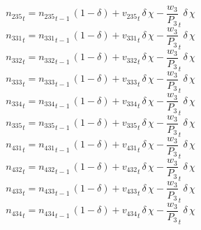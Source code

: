 \begin{dmath}
{{n_{235}}}_{t}={{n_{235}}}_{t-1}\, \left(1-{{\delta}}\right)+{{v_{235}}}_{t}\, {{\delta}}\, {{\chi}}-{{\frac{w_{3}}{P_{3}}}}_{t}\, {{\delta}}\, {{\chi}}
\end{dmath}
\begin{dmath}
{{n_{331}}}_{t}={{n_{331}}}_{t-1}\, \left(1-{{\delta}}\right)+{{v_{331}}}_{t}\, {{\delta}}\, {{\chi}}-{{\frac{w_{3}}{P_{3}}}}_{t}\, {{\delta}}\, {{\chi}}
\end{dmath}
\begin{dmath}
{{n_{332}}}_{t}={{n_{332}}}_{t-1}\, \left(1-{{\delta}}\right)+{{v_{332}}}_{t}\, {{\delta}}\, {{\chi}}-{{\frac{w_{3}}{P_{3}}}}_{t}\, {{\delta}}\, {{\chi}}
\end{dmath}
\begin{dmath}
{{n_{333}}}_{t}={{n_{333}}}_{t-1}\, \left(1-{{\delta}}\right)+{{v_{333}}}_{t}\, {{\delta}}\, {{\chi}}-{{\frac{w_{3}}{P_{3}}}}_{t}\, {{\delta}}\, {{\chi}}
\end{dmath}
\begin{dmath}
{{n_{334}}}_{t}={{n_{334}}}_{t-1}\, \left(1-{{\delta}}\right)+{{v_{334}}}_{t}\, {{\delta}}\, {{\chi}}-{{\frac{w_{3}}{P_{3}}}}_{t}\, {{\delta}}\, {{\chi}}
\end{dmath}
\begin{dmath}
{{n_{335}}}_{t}={{n_{335}}}_{t-1}\, \left(1-{{\delta}}\right)+{{v_{335}}}_{t}\, {{\delta}}\, {{\chi}}-{{\frac{w_{3}}{P_{3}}}}_{t}\, {{\delta}}\, {{\chi}}
\end{dmath}
\begin{dmath}
{{n_{431}}}_{t}={{n_{431}}}_{t-1}\, \left(1-{{\delta}}\right)+{{v_{431}}}_{t}\, {{\delta}}\, {{\chi}}-{{\frac{w_{3}}{P_{3}}}}_{t}\, {{\delta}}\, {{\chi}}
\end{dmath}
\begin{dmath}
{{n_{432}}}_{t}={{n_{432}}}_{t-1}\, \left(1-{{\delta}}\right)+{{v_{432}}}_{t}\, {{\delta}}\, {{\chi}}-{{\frac{w_{3}}{P_{3}}}}_{t}\, {{\delta}}\, {{\chi}}
\end{dmath}
\begin{dmath}
{{n_{433}}}_{t}={{n_{433}}}_{t-1}\, \left(1-{{\delta}}\right)+{{v_{433}}}_{t}\, {{\delta}}\, {{\chi}}-{{\frac{w_{3}}{P_{3}}}}_{t}\, {{\delta}}\, {{\chi}}
\end{dmath}
\begin{dmath}
{{n_{434}}}_{t}={{n_{434}}}_{t-1}\, \left(1-{{\delta}}\right)+{{v_{434}}}_{t}\, {{\delta}}\, {{\chi}}-{{\frac{w_{3}}{P_{3}}}}_{t}\, {{\delta}}\, {{\chi}}
\end{dmath}
